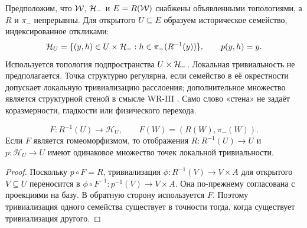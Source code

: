 \section{}
\label{sec:topology}
{Предположим, что $\mathcal W$, $\mathcal H_-$ и $E=R(\mathcal W)$ снабжены объявленными топологиями, а $R$ и $\pi_-$ непрерывны. Для открытого $U\subseteq E$ образуем историческое семейство, индексированное откликами:}
\begin{equation}\label{eq:history-family}
\mathcal H_U=\{(y,h)\in U\times\mathcal H_-:h\in\pi_-(R^{-1}(y))\},
\qquad p(y,h)=y.
\end{equation}
{Используется топология подпространства $U\times\mathcal H_-$. Локальная тривиальность не предполагается. Точка структурно регулярна, если семейство в её окрестности допускает локальную тривиализацию расслоения; дополнительное множество является структурной стеной в смысле WR-III \cite[Section 8]{WRIII}. Само слово «стена» не задаёт коразмерности, гладкости или физического перехода.}

\begin{proposition}
\label{prop:wall-transfer}
\[
F:R^{-1}(U)\to\mathcal H_U,\qquad F(W)=(R(W),\pi_-(W)).
\]
{Если $F$ является гомеоморфизмом, то отображения $R:R^{-1}(U)\to U$ и $p:\mathcal H_U\to U$ имеют одинаковое множество точек локальной тривиальности.}
\end{proposition}
\begin{proof}
{Поскольку $p\circ F=R$, тривиализация $\phi:R^{-1}(V)\to V\times A$ для открытого $V\subseteq U$ переносится в $\phi\circ F^{-1}:p^{-1}(V)\to V\times A$. Она по-прежнему согласована с проекциями на базу. В обратную сторону используется $F$. Поэтому тривиализация одного семейства существует в точности тогда, когда существует тривиализация другого.}
\end{proof}

